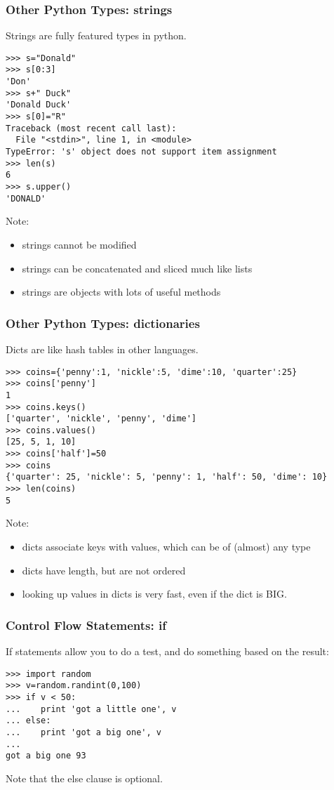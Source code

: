 \documentclass[10pt]{beamer}
\begin{document}
\begin{frame}[fragile]
\frametitle{Other Python Types: strings}

Strings are fully featured types in python.

\begin{verbatim}
>>> s="Donald"
>>> s[0:3]
'Don'
>>> s+" Duck"
'Donald Duck'
>>> s[0]="R"
Traceback (most recent call last):
  File "<stdin>", line 1, in <module>
TypeError: 's' object does not support item assignment
>>> len(s)
6
>>> s.upper()
'DONALD'
\end{verbatim}

Note:
\begin{itemize}
\item strings cannot be modified
\item strings can be concatenated and sliced much like lists
\item strings are objects with lots of useful methods
\end{itemize}

\end{frame}


\begin{frame}[fragile]
\frametitle{Other Python Types: dictionaries}

Dicts are like hash tables in other languages.  
\begin{verbatim}
>>> coins={'penny':1, 'nickle':5, 'dime':10, 'quarter':25}
>>> coins['penny']
1
>>> coins.keys()
['quarter', 'nickle', 'penny', 'dime']
>>> coins.values()
[25, 5, 1, 10]
>>> coins['half']=50
>>> coins
{'quarter': 25, 'nickle': 5, 'penny': 1, 'half': 50, 'dime': 10}
>>> len(coins)
5
\end{verbatim}

Note:
\begin{itemize}
\item dicts associate keys with values, which can be of (almost) any type 
\item dicts have length, but are not ordered
\item looking up values in dicts is very fast, even if the dict is BIG.
\end{itemize}

\end{frame}

\begin{frame}[fragile]
\frametitle{Control Flow Statements: if}

If statements allow you to do a test, and do something
based on the result:

\begin{verbatim}
>>> import random
>>> v=random.randint(0,100)
>>> if v < 50:
...    print 'got a little one', v
... else:
...    print 'got a big one', v
... 
got a big one 93
\end{verbatim}

Note that the else clause is optional.

\end{frame}
\end{document}
